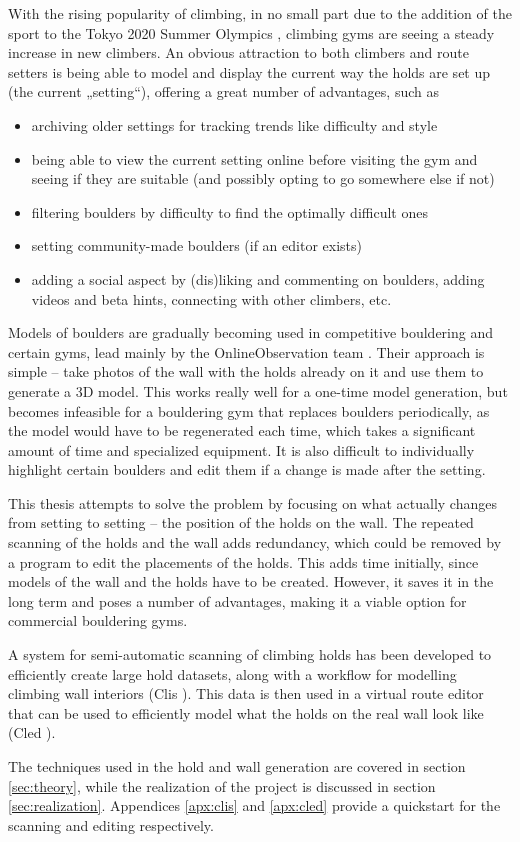

With the rising popularity of climbing, in no small part due to the addition of the sport to the Tokyo 2020 Summer Olympics \cite{olympics}, climbing gyms are seeing a steady increase in new climbers.
An obvious attraction to both climbers and route setters is being able to model and display the current way the holds are set up (the current „setting“), offering a great number of advantages, such as

\begin{itemize}
	\item archiving older settings for tracking trends like difficulty and style
	\item being able to view the current setting online before visiting the gym and seeing if they are suitable (and possibly opting to go somewhere else if not)
	\item filtering boulders by difficulty to find the optimally difficult ones
	\item setting community-made boulders (if an editor exists)
	\item adding a social aspect by (dis)liking and commenting on boulders, adding videos and beta hints, connecting with other climbers, etc.
\end{itemize}

Models of boulders are gradually becoming used in competitive bouldering and certain gyms, lead mainly by the OnlineObservation team \cite{onlineobservation}.
Their approach is simple -- take photos of the wall with the holds already on it and use them to generate a 3D model.
This works really well for a one-time model generation, but becomes infeasible for a bouldering gym that replaces boulders periodically, as the model would have to be regenerated each time, which takes a significant amount of time and specialized equipment.
It is also difficult to individually highlight certain boulders and edit them if a change is made after the setting.

This thesis attempts to solve the problem by focusing on what actually changes from setting to setting -- the position of the holds on the wall.
The repeated scanning of the holds and the wall adds redundancy, which could be removed by a program to edit the placements of the holds.
This adds time initially, since models of the wall and the holds have to be created.
However, it saves it in the long term and poses a number of advantages, making it a viable option for commercial bouldering gyms.

A system for semi-automatic scanning of climbing holds has been developed to efficiently create large hold datasets, along with a workflow for modelling climbing wall interiors (Clis \cite{clis}).
This data is then used in a virtual route editor that can be used to efficiently model what the holds on the real wall look like (Cled \cite{cled}).

The techniques used in the hold and wall generation are covered in section \ref{sec:theory}, while the realization of the project is discussed in section \ref{sec:realization}.
Appendices \ref{apx:clis} and \ref{apx:cled} provide a quickstart for the scanning and editing respectively.
